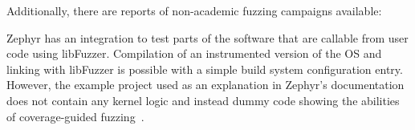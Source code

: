 \documentclass[twocolumn]{article}
\let\savedCite=\cite
\renewcommand{\cite}{\unskip~\savedCite}
\begin{document}

Additionally, there are reports of non-academic fuzzing campaigns available:

Zephyr has an integration to test parts of the software that are callable from user code using libFuzzer. Compilation of an instrumented version of the OS and linking with libFuzzer is possible with a simple build system configuration entry. However, the example project used as an explanation in Zephyr's documentation does not contain any kernel logic and instead dummy code showing the abilities of coverage-guided fuzzing\cite{ZephyrFuzzing, ZephyrFuzzingSample}.
\end{document}
